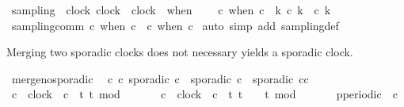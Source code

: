\begin{isabellebody}
\isamarkupfalse%
\ sampling\ {\isacharcolon}{\isacharcolon}\ {\isacartoucheopen}{\isacharbrackleft}clock{\isacharcomma}\ clock{\isacharbrackright}\ {\isasymRightarrow}\ clock{\isacartoucheclose}\ {\isacharparenleft}\ {\isacartoucheopen}when{\isacartoucheclose}\ {}{}{\isacharparenright}\isanewline
\ \ \ {\isacartoucheopen}c\ when\ c{\isacharprime}\ {\isasymequiv}\ {\isasymlambda}k{\isachardot}\ c\ k\ {\isasymand}\ c{\isacharprime}\ k{\isacartoucheclose}\isanewline
\isanewline
{}\isamarkupfalse%
\ sampling{\isacharunderscore}comm{\isacharcolon}\ {\isacartoucheopen}c\ when\ c{\isacharprime}\ {\isacharequal}\ c{\isacharprime}\ when\ c{\isacartoucheclose}\isanewline
%
\isadelimproof
%
\endisadelimproof
%
\isatagproof
{}\isamarkupfalse%
\ {\isacharparenleft}auto\ simp\ add{\isacharcolon}\ sampling{\isacharunderscore}def{\isacharparenright}%
\endisatagproof
{\isafoldproof}%
%
\isadelimproof
%
\endisadelimproof
%
\begin{isamarkuptext}%
Merging two sporadic clocks does not necessary yields a sporadic clock.%
\end{isamarkuptext}\isamarkuptrue%
\isamarkupfalse%
\ merge{\isacharunderscore}no{\isacharunderscore}sporadic{\isacharcolon}\isanewline
\ \ {\isacartoucheopen}{\isasymexists}c\ c{\isacharprime}{\isachardot}\ sporadic\ c\ {\isasymand}\ sporadic\ c{\isacharprime}\ {\isasymand}\ {\isasymnot}sporadic\ {\isacharparenleft}c{\isasymoplus}c{\isacharprime}{\isacharparenright}{\isacartoucheclose}\isanewline
%
\isadelimproof
%
\endisadelimproof
%
\isatagproof
{}\isamarkupfalse%
\ {\isacharminus}\isanewline
\ \ \isamarkupfalse%
\ c\ {\isacharcolon}{\isacharcolon}\ clock\ \ {\isacartoucheopen}c\ {\isacharequal}\ {\isacharparenleft}{\isasymlambda}t{\isachardot}\ t\ mod\ {}\ {\isacharequal}\ {}{\isacharparenright}{\isacartoucheclose}\isanewline
\ \ \isamarkupfalse%
\ c{\isacharprime}\ {\isacharcolon}{\isacharcolon}\ clock\ \ {\isacartoucheopen}c{\isacharprime}\ {\isacharequal}\ {\isacharparenleft}{\isasymlambda}t{\isachardot}\ t\ {\isasymge}\ {}\ {\isasymand}\ {\isacharparenleft}t{\isacharminus}{}{\isacharparenright}\ mod\ {}\ {\isacharequal}\ {}{\isacharparenright}{\isacartoucheclose}\isanewline
\isanewline
\ \ \isamarkupfalse%
\ {\isacartoucheopen}p{\isacharunderscore}periodic\ {}\ c{\isacartoucheclose}\ \isamarkupfalse%

\end{isabellebody}
